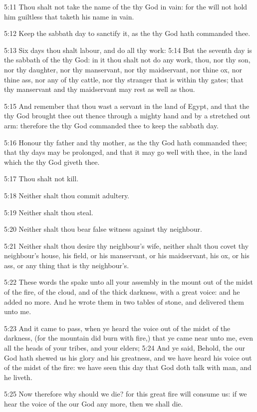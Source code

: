 5:11 Thou shalt not take the name of the \LORD thy God in vain: for the
\LORD will not hold him guiltless that taketh his name in vain.

5:12 Keep the sabbath day to sanctify it, as the \LORD thy God hath
commanded thee.

5:13 Six days thou shalt labour, and do all thy work: 5:14 But the
seventh day is the sabbath of the \LORD thy God: in it thou shalt not
do any work, thou, nor thy son, nor thy daughter, nor thy manservant,
nor thy maidservant, nor thine ox, nor thine ass, nor any of thy
cattle, nor thy stranger that is within thy gates; that thy manservant
and thy maidservant may rest as well as thou.

5:15 And remember that thou wast a servant in the land of Egypt, and
that the \LORD thy God brought thee out thence through a mighty hand
and by a stretched out arm: therefore the \LORD thy God commanded thee
to keep the sabbath day.

5:16 Honour thy father and thy mother, as the \LORD thy God hath
commanded thee; that thy days may be prolonged, and that it may go
well with thee, in the land which the \LORD thy God giveth thee.

5:17 Thou shalt not kill.

5:18 Neither shalt thou commit adultery.

5:19 Neither shalt thou steal.

5:20 Neither shalt thou bear false witness against thy neighbour.

5:21 Neither shalt thou desire thy neighbour's wife, neither shalt
thou covet thy neighbour's house, his field, or his manservant, or his
maidservant, his ox, or his ass, or any thing that is thy neighbour's.

5:22 These words the \LORD spake unto all your assembly in the mount
out of the midst of the fire, of the cloud, and of the thick darkness,
with a great voice: and he added no more. And he wrote them in two
tables of stone, and delivered them unto me.

5:23 And it came to pass, when ye heard the voice out of the midst of
the darkness, (for the mountain did burn with fire,) that ye came near
unto me, even all the heads of your tribes, and your elders; 5:24 And
ye said, Behold, the \LORD our God hath shewed us his glory and his
greatness, and we have heard his voice out of the midst of the fire:
we have seen this day that God doth talk with man, and he liveth.

5:25 Now therefore why should we die? for this great fire will consume
us: if we hear the voice of the \LORD our God any more, then we shall
die.

